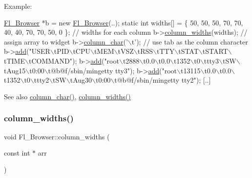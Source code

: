 Example\+: 
\begin{DoxyCode}
\hyperlink{class_fl___browser}{Fl\_Browser} *b = \textcolor{keyword}{new} \hyperlink{class_fl___browser_a5d3af1b476a55adac06f5c07ed897243}{Fl\_Browser}(..);
\textcolor{keyword}{static} \textcolor{keywordtype}{int} widths[] = \{ 50, 50, 50, 70, 70, 40, 40, 70, 70, 50, 0 \};  \textcolor{comment}{// widths for each column}
b->\hyperlink{class_fl___browser_a4a473cbb2e5f5d54b63549704a3a0dd0}{column\_widths}(widths); \textcolor{comment}{// assign array to widget}
b->\hyperlink{class_fl___browser_ab27dc1a532ccd1c370820229cc1b99f6}{column\_char}(\textcolor{charliteral}{'\(\backslash\)t'});     \textcolor{comment}{// use tab as the column character}
b->\hyperlink{class_fl___browser_af2761597d5618fa4d1339563ee127e29}{add}(\textcolor{stringliteral}{"USER\(\backslash\)tPID\(\backslash\)tCPU\(\backslash\)tMEM\(\backslash\)tVSZ\(\backslash\)tRSS\(\backslash\)tTTY\(\backslash\)tSTAT\(\backslash\)tSTART\(\backslash\)tTIME\(\backslash\)tCOMMAND"});
b->\hyperlink{class_fl___browser_af2761597d5618fa4d1339563ee127e29}{add}(\textcolor{stringliteral}{"root\(\backslash\)t2888\(\backslash\)t0.0\(\backslash\)t0.0\(\backslash\)t1352\(\backslash\)t0\(\backslash\)ttty3\(\backslash\)tSW\(\backslash\)tAug15\(\backslash\)t0:00\(\backslash\)t@b@f/sbin/mingetty tty3"});
b->\hyperlink{class_fl___browser_af2761597d5618fa4d1339563ee127e29}{add}(\textcolor{stringliteral}{"root\(\backslash\)t13115\(\backslash\)t0.0\(\backslash\)t0.0\(\backslash\)t1352\(\backslash\)t0\(\backslash\)ttty2\(\backslash\)tSW\(\backslash\)tAug30\(\backslash\)t0:00\(\backslash\)t@b@f/sbin/mingetty tty2"});
[..]
\end{DoxyCode}
 \begin{DoxySeeAlso}{See also}
\hyperlink{class_fl___browser_ab27dc1a532ccd1c370820229cc1b99f6}{column\+\_\+char()}, \hyperlink{class_fl___browser_a4a473cbb2e5f5d54b63549704a3a0dd0}{column\+\_\+widths()} 
\end{DoxySeeAlso}
\mbox{\label{class_fl___browser_a89d1d56c2ae36454877ee2dc9297f5de}} 
\subsubsection{\texorpdfstring{column\+\_\+widths()}{column\_widths()}\hspace{0.1cm}{\footnotesize\ttfamily [2/2]}}
{\footnotesize\ttfamily void Fl\+\_\+\+Browser\+::column\+\_\+widths (\begin{DoxyParamCaption}\item[{const int $\ast$}]{arr }\end{DoxyParamCaption})\hspace{0.3cm}{\ttfamily [inline]}}

